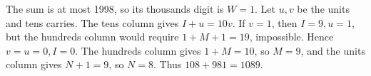 The sum is at most 1998, so its thousands digit is $ W=1 $. Let $ u,v $ be the units and tens carries. The tens column gives $ I+u=10v $. If $ v=1 $, then $ I=9,u=1 $, but the hundreds column would require $ 1+M+1=19 $, impossible. Hence $ v=u=0,I=0 $. The hundreds column gives $ 1+M=10 $, so $ M=9 $, and the units column gives $ N+1=9 $, so $ N=8 $. Thus $ 108+981=\boxed{1089}$.
